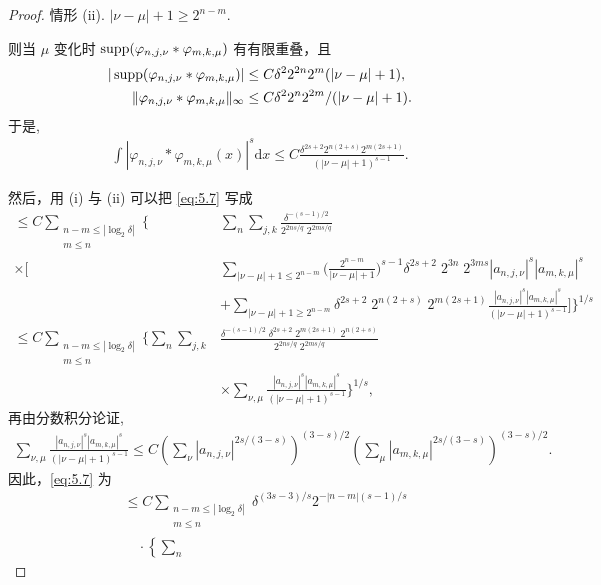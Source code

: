 \begin{proof}
情形 (ii). $\left|\nu - \mu\right| + 1 \geq 2^{n-m}$.

则当 $\mu$ 变化时 $\operatorname{supp}(\varphi_{n,j,\nu} * \varphi_{m,k,\mu})$ 有有限重叠，且
\begin{align*}
  |\operatorname{supp}(\varphi_{n,j,\nu}*\varphi_{m,k,\mu})|
  &\leq C\delta^{2}2^{2n}2^{m}(|\nu-\mu|+1),\\
  \|\varphi_{n,j,\nu}*\varphi_{m,k,\mu}\|_{\infty}
  &\leq C\delta^{2}2^{n}2^{2m}/(|\nu-\mu|+1).
\end{align*}
于是,
\begin{align*}
  \int\left|\varphi_{n,j,\nu}*\varphi_{m,k,\mu}(x)\right|^{s}\mathrm{d}x
  \leq C\frac{\delta^{2s+2}2^{n(2+s)}2^{m(2s+1)}}{\left(|\nu-\mu|+1\right)^{s-1}}.
\end{align*}

然后，用 (i) 与 (ii) 可以把 \eqref{eq:5.7} 写成
\begin{align*}
  \leq C\sum_{\substack{n-m\leq|\log_{2}\delta|\\ m\leq n}}\Bigg\{&\sum_{n}\sum_{j,k}\frac{\delta^{-(s-1)/2}}{2^{2ns/q}\;2^{2ms/q}}\\
  \times\Big[&\sum_{|\nu-\mu|+1\leq 2^{n-m}}\Big(\frac{2^{n-m}}{|\nu-\mu|+1}\Big)^{s-1}\delta^{2s+2}\;2^{3n}\;2^{3ms}|a_{n,j,\nu}|^{s}|a_{m,k,\mu}|^{s}\\
  &+\sum_{|\nu-\mu|+1\geq 2^{n-m}}\delta^{2s+2}\;2^{n(2+s)}\;2^{m(2s+1)}
   \frac{|a_{n,j,\nu}|^{s}|a_{m,k,\mu}|^{s}}{(|\nu-\mu|+1)^{s-1}}\Big]\Bigg\}^{1/s}\\
  \leq C\sum_{\substack{n-m\leq|\log_{2}\delta|\\ m\leq n}}\Bigg\{\sum_{n}\sum_{j,k}
  &\frac{\delta^{-(s-1)/2}\;\delta^{2s+2}\;2^{m(2s+1)}\;2^{n(2+s)}}{2^{2ns/q}\;2^{2ms/q}}\\
  &\times\sum_{\nu,\mu}\frac{|a_{n,j,\nu}|^{s}|a_{m,k,\mu}|^{s}}{(|\nu-\mu|+1)^{s-1}}\Bigg\}^{1/s},
\end{align*}
再由分数积分论证,
\begin{align*}
  \sum_{\nu,\mu}\frac{\left|a_{n,j,\nu}\right|^{s}\left|a_{m,k,\mu}\right|^{s}}{(|\nu-\mu|+1)^{s-1}}
  \leq C\left(\sum_{\nu}\left|a_{n,j,\nu}\right|^{2s/(3-s)}\right)^{(3-s)/2}
  \left(\sum_{\mu}\left|a_{m,k,\mu}\right|^{2s/(3-s)}\right)^{(3-s)/2}.
\end{align*}
因此，\eqref{eq:5.7} 为
\begin{align*}
  &\leq C\sum_{\substack{n-m\leq|\log_{2}\delta|\\ m\leq n}}
   \delta^{(3s-3)/s}2^{-|n-m|(s-1)/s}\\
  &\quad\cdot\left\{\sum_{n}

\end{align*}
\end{proof}
